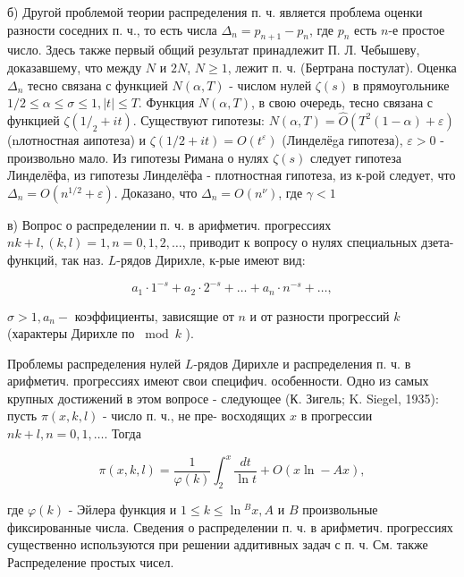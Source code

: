 \documentclass[10pt]{article}
\begin{document}
б) Другой проблемой теории распределения п. ч. является проблема оценки разности соседних п. ч., то есть числа $\Delta_{n}=p_{n+1}-p_{n}$, где $p_{n}$ есть $n$-е простое число. Здесь также первый общий результат принадлежит П. Л. Чебышеву, доказавшему, что между $N$ и $2 N$, $N \geqslant 1$, лежит п. ч. (Бертрана постулат). Оценка $\Delta_{n}$ тесно связана с функцией $N(\alpha, T)$ - числом нулей $\zeta(s)$ в прямоугольнике $1 / 2 \leqslant \alpha \leqslant \sigma \leqslant 1,|t| \leqslant T$. Функция $N(\alpha, T)$, в свою очередь, тесно связана с функцией $\zeta\left(1 /_{2}+i t\right)$. Существуют гипотезы: $N(\alpha, T)=\hat{O}\left(T^{2}(1-\alpha)+\varepsilon\right)$ (nлотностная аипотеза) и $\zeta(1 / 2+i t)=O\left(t^{\varepsilon}\right)$ (Линделёgа гипотеза), $\varepsilon>0$ - произвольно мало. Из гипотезы Римана о нулях $\zeta(s)$ следует гипотеза Линделёфа, из гипотезы Линделёфа - плотностная гипотеза, из к-рой следует, что $\Delta_{n}=O\left(n^{1 / 2}+\varepsilon\right)$. Доказано, что $\Delta_{n}=O\left(n^{\nu}\right)$, где $\gamma<1$



в) Вопрос о распределении п. ч. в арифметич. прогрессиях $n k+l,(k, l)=1, n=0,1,2, \ldots$, приводит к вопросу о нулях специальных дзета-функций, так наз. $L$-рядов Дирихле, к-рые имеют вид:



\[

a_{1} \cdot 1^{-s}+a_{2} \cdot 2^{-s}+\ldots+a_{n} \cdot n^{-s}+\ldots,

\]



$\sigma>1, a_{n}-$ коэффициенты, зависящие от $n$ и от разности прогрессий $k$ (характеры Дирихле по $\bmod k$ ).



Проблемы распределения нулей $L$-рядов Дирихле и распределения п. ч. в арифметич. прогрессиях имеют свои специфич. особенности. Одно из самых крупных достижений в этом вопросе - следующее (К. Зигель; K. Siegel, 1935): пусть $\pi(x, k, l)$ - число п. ч., не пре- восходящих $x$ в прогрессии $n k+l, n=0,1, \ldots$. Тогда



\[

\pi(x, k, l)=\frac{1}{\varphi(k)} \int_{2}^{x} \frac{d t}{\ln t}+O(x \ln -A x),

\]



где $\varphi(k)$ - Эйлера функция и $1 \leqslant k \leqslant \ln { }^{B} x, A$ и $B$ произвольные фиксированные числа. Сведения о распределении п. ч. в арифметич. прогрессиях существенно используются при решении аддитивных задач с п. ч. См. также Распределение простых чисел.
\end{document}
